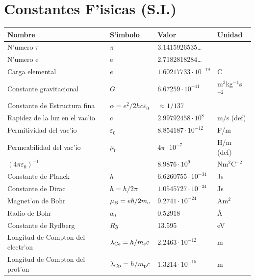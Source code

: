\chapter{Constantes F'isicas (S.I.)}\label{app:constantes}
\begin{center}
\begin{tabular}{||l|lll||}
\hline
{\bf Nombre}&{\bf S'imbolo}&{\bf Valor}&{\bf Unidad}\\
\hline
\hline
N'umero $\pi$                 &$\pi$&3.1415926535\dots&\\
N'umero e                     &e    &2.7182818284\dots&\\
\hline
Carga elemental            &$e$&$1.60217733\cdot10^{-19}$&C\rule{0pt}{13pt}\\
Constante gravitacional  &$G$&$6.67259\cdot10^{-11}$&m$^3$kg$^{-1}$s$^{-2}$\\
Constante de Estructura fina &$\alpha=e^2/2hc\varepsilon_0$&$\approx1/137$&\\
Rapidez de la luz en el vac'io    &$c$&$2.99792458\cdot10^8$&m/s (def)\\
Permitividad del vac'io   &$\varepsilon_0$&$8.854187\cdot10^{-12}$&F/m\\
Permeabilidad del vac'io &$\mu_0$&$4\pi\cdot10^{-7}$&H/m (def)\\
$(4\pi\varepsilon_0)^{-1}$   &&$8.9876\cdot10^9$&Nm$^2$C$^{-2}$\\
\hline
Constante de Planck           &$h$&$6.6260755\cdot10^{-34}$&Js\rule{0pt}{13pt}\\
Constante de Dirac             &$\hbar=h/2\pi$&$1.0545727\cdot10^{-34}$&Js\\
Magnet'on de Bohr              &$\mu_{\rm B}=e\hbar/2m_{\rm e}$&$9.2741\cdot10^{-24}$&Am$^2$\\
Radio de Bohr                 &$a_0$&$0.52918$&\AA\\
Constante de Rydberg     &$Ry$&13.595&eV\\
Longitud de Compton del electr'on  &$\lambda_{\rm Ce}=h/m_{\rm e} c$&$2.2463\cdot10^{-12}$&m\\
Longitud de Compton del prot'on   &$\lambda_{\rm Cp}=h/m_{\rm p}c$&$1.3214\cdot10^{-15}$&m\\

\end{tabular}
\end{center}
